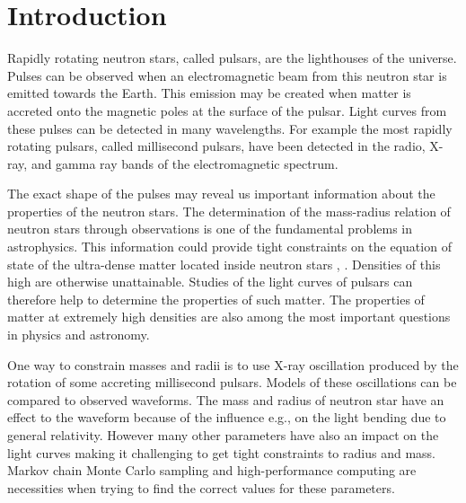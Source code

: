 \documentclass{wihuri}
\begin{document}
\tableofcontents %

\newpage





\section*{Introduction}

Rapidly rotating neutron stars, called pulsars, are the lighthouses of the universe. Pulses can be observed when an electromagnetic beam from this neutron star is emitted towards the Earth.  This emission may be created when matter is accreted onto the magnetic poles at the surface of the pulsar. Light curves from these pulses can be detected in many wavelengths. For example the most rapidly rotating pulsars, called millisecond pulsars, have been detected in the radio, X-ray, and gamma ray bands of the electromagnetic spectrum.

The exact shape of the pulses may reveal us important information about the properties of the neutron stars. The determination of the mass-radius relation of neutron stars through observations is one of the fundamental problems in astrophysics. This information could provide tight constraints on the equation of state of the ultra-dense matter located inside neutron stars \cite{lattimer2007}, \cite{hebeler}. Densities of this high are otherwise unattainable.
Studies of the light curves of pulsars can therefore help to determine the properties of such matter. The properties of matter at extremely high densities are also among the most important questions in physics and astronomy. 


One way to constrain masses and radii is to use X-ray oscillation produced by the rotation of some accreting millisecond pulsars. Models of these oscillations can be compared to observed waveforms.  
The mass and radius of neutron star have an effect to the waveform because of the influence e.g., on the light bending due to general relativity. However many other parameters have also an impact on the light curves making it challenging to get tight constraints to radius and mass. Markov chain Monte Carlo sampling and high-performance computing are necessities when trying to find the correct values for these parameters. 
\end{document}

